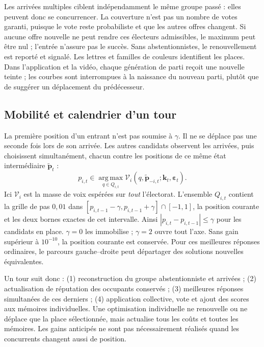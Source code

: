 \documentclass[11pt,a4paper]{article}
\begin{document}
Les arrivées multiples ciblent indépendamment le même groupe passé :
elles peuvent donc se concurrencer. La couverture n'est pas un nombre
de votes garanti, puisque le vote reste probabiliste et que les autres
offres changent. Si aucune offre nouvelle ne peut rendre ces électeurs
admissibles, le maximum peut être nul ; l'entrée n'assure pas le succès.
Sans abstentionnistes, le renouvellement est reporté et signalé.
Les lettres et familles de couleurs identifient les places. Dans
l'application et la vidéo, chaque génération de parti reçoit une
nouvelle teinte ; les courbes sont interrompues à la naissance du
nouveau parti, plutôt que de suggérer un déplacement du prédécesseur.

\subsection{Mobilité et calendrier d'un tour}
La première position d'un entrant n'est pas soumise à $\gamma$.
Il ne se déplace pas une seconde fois lors de son arrivée. Les autres
candidats observent les arrivées, puis choisissent simultanément, chacun
contre les positions de ce même état intermédiaire $\widetilde{\mathbf p}_t$ :
\[
p_{i,t}\in\operatorname*{arg\,max}_{q\in Q_{i,t}}
\mathcal V_i(q,\widetilde{\mathbf p}_{-i,t};
             \mathbf k_t,\boldsymbol\varepsilon_t).
\]
Ici $\mathcal V_i$ est la masse de voix espérées sur \emph{tout}
l'électorat. L'ensemble $Q_{i,t}$ contient la grille de pas $0{,}01$
dans $[p_{i,t-1}-\gamma,p_{i,t-1}+\gamma]\cap[-1,1]$,
la position courante et les deux bornes exactes de cet intervalle.
Ainsi $|p_{i,t}-p_{i,t-1}|\leq\gamma$ pour les candidats en place.
$\gamma=0$ les immobilise ; $\gamma=2$ ouvre tout l'axe.
Sans gain supérieur à $10^{-10}$, la position courante est conservée.
Pour ces meilleures réponses ordinaires, le parcours gauche--droite
peut départager des solutions nouvelles équivalentes.

Un tour suit donc : (1) reconstruction du groupe abstentionniste et
arrivées ; (2) actualisation de réputation des occupants conservés ;
(3) meilleures réponses simultanées de ces derniers ; (4) application
collective, vote et ajout des scores aux mémoires individuelles.
Une optimisation individuelle ne renouvelle ou ne déplace que la place
sélectionnée, mais actualise tous les coûts et toutes les mémoires.
Les gains anticipés ne sont pas nécessairement réalisés quand les
concurrents changent aussi de position.
\end{document}
